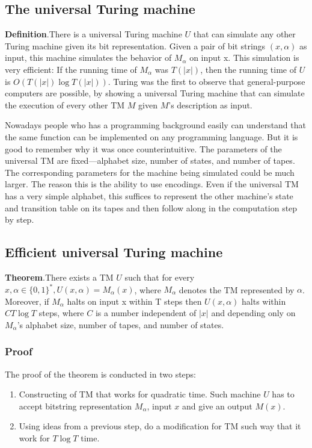 \documentclass[a4paper,12pt]{article}
\begin{document}
\subsection{The universal Turing machine}
\textbf{Definition}.There is a universal Turing machine $U$ that can simulate any other Turing machine given
its bit representation. Given a pair of bit strings $(x, \alpha)$ as input, this machine simulates
the behavior of $M_\alpha$ on input x. This simulation is very efficient: If the running time of
$M_\alpha$ was $T(|x|)$, then the running time of $U$ is $O(T(|x|) \log{T(|x|)})$.
Turing was the first to observe that general-purpose computers are possible, by showing
a universal Turing machine that can simulate the execution of every other TM $M$ given
$M$’s description as input.

\par 
Nowadays people who has a programming background easily can understand that the same function can be implemented on any programming language. 
But it is good to remember why it was once counterintuitive. The parameters of the universal
TM are fixed—alphabet size, number of states, and number of tapes. The corresponding
parameters for the machine being simulated could be much larger. The reason this is the ability to use encodings. Even if the universal TM has a
very simple alphabet, this suffices to represent the other machine’s state and transition
table on its tapes and then follow along in the computation step by step.

\subsection{Efficient universal Turing machine}
\textbf{Theorem}.There exists a TM $U$ such that for every $x, \alpha \in \{0, 1\}^{*} , U(x, \alpha) = M_\alpha(x)$, where $M_\alpha$
denotes the TM represented by $\alpha$.
Moreover, if $M_\alpha$ halts on input x within T steps then $U(x, \alpha)$ halts within $CT \log{T}$ steps,
where $C$ is a number independent of $|x|$ and depending only on $M_\alpha$'s alphabet size,
number of tapes, and number of states.

\subsubsection{Proof}
The proof of the theorem is conducted in two steps:

\begin{enumerate}
\item Constructing of TM that works for quadratic time. Such machine $U$ has to accept bitstring representation $M_\alpha$, input $x$ and give an output $M(x)$.  
\item Using ideas from a previous step, do a modification for TM such way that it work for $T \log{T}$ time.
\end{enumerate}
\end{document}
